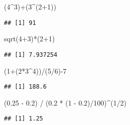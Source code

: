 \documentclass[
]{book}
\newenvironment{Shaded}{\begin{snugshade}}{\end{snugshade}}
\newcommand{\DecValTok}[1]{\textcolor[rgb]{0.00,0.00,0.81}{#1}}
\newcommand{\FloatTok}[1]{\textcolor[rgb]{0.00,0.00,0.81}{#1}}
\newcommand{\FunctionTok}[1]{\textcolor[rgb]{0.00,0.00,0.00}{#1}}
\newcommand{\NormalTok}[1]{#1}
\newcommand{\SpecialCharTok}[1]{\textcolor[rgb]{0.00,0.00,0.00}{#1}}
\theoremstyle{definition}
\theoremstyle{definition}
\theoremstyle{definition}
\theoremstyle{definition}
\theoremstyle{remark}
\begin{document}
\begin{Shaded}
\begin{Highlighting}[]
\NormalTok{(}\DecValTok{4}\SpecialCharTok{\^{}}\DecValTok{3}\NormalTok{)}\SpecialCharTok{+}\NormalTok{(}\DecValTok{3}\SpecialCharTok{\^{}}\NormalTok{(}\DecValTok{2}\SpecialCharTok{+}\DecValTok{1}\NormalTok{))}
\end{Highlighting}
\end{Shaded}

\begin{verbatim}
## [1] 91
\end{verbatim}

\begin{Shaded}
\begin{Highlighting}[]
\FunctionTok{sqrt}\NormalTok{(}\DecValTok{4}\SpecialCharTok{+}\DecValTok{3}\NormalTok{)}\SpecialCharTok{*}\NormalTok{(}\DecValTok{2}\SpecialCharTok{+}\DecValTok{1}\NormalTok{)}
\end{Highlighting}
\end{Shaded}

\begin{verbatim}
## [1] 7.937254
\end{verbatim}

\begin{Shaded}
\begin{Highlighting}[]
\NormalTok{(}\DecValTok{1}\SpecialCharTok{+}\NormalTok{(}\DecValTok{2}\SpecialCharTok{*}\DecValTok{3}\SpecialCharTok{\^{}}\DecValTok{4}\NormalTok{))}\SpecialCharTok{/}\NormalTok{(}\DecValTok{5}\SpecialCharTok{/}\DecValTok{6}\NormalTok{)}\SpecialCharTok{{-}}\DecValTok{7}
\end{Highlighting}
\end{Shaded}

\begin{verbatim}
## [1] 188.6
\end{verbatim}

\begin{Shaded}
\begin{Highlighting}[]
\NormalTok{(}\FloatTok{0.25} \SpecialCharTok{{-}} \FloatTok{0.2}\NormalTok{) }\SpecialCharTok{/}\NormalTok{ (}\FloatTok{0.2} \SpecialCharTok{*}\NormalTok{ (}\DecValTok{1} \SpecialCharTok{{-}} \FloatTok{0.2}\NormalTok{)}\SpecialCharTok{/}\DecValTok{100}\NormalTok{)}\SpecialCharTok{\^{}}\NormalTok{(}\DecValTok{1}\SpecialCharTok{/}\DecValTok{2}\NormalTok{)}
\end{Highlighting}
\end{Shaded}

\begin{verbatim}
## [1] 1.25
\end{verbatim}
\end{document}
